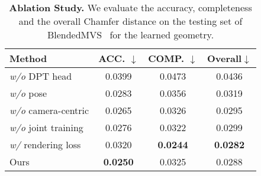 \begin{table}%
\centering
\caption{
\textbf{Ablation Study.} We evaluate the accuracy, completeness and the overall Chamfer distance on the testing set of BlendedMVS~\cite{yao2020blendedmvs} for the learned geometry. 
}
\small
\begin{tabular}{l|ccc}
\toprule
Method & ACC. $\downarrow$ & COMP. $\downarrow$ & Overall$\downarrow$ \\
\midrule
\textit{w/o} DPT head & 0.0399 & 0.0473 &  0.0436 \\
\textit{w/o} pose & 0.0283 & 0.0356 &  0.0319 \\
\textit{w/o} camera-centric  & 0.0265 & 0.0326 & 0.0295 \\
\textit{w/o} joint training  & 0.0276 & 0.0322 & 0.0299 \\
\textit{w/} rendering loss  & 0.0320 & \textbf{0.0244} & \textbf{0.0282}\\

\midrule
Ours  & \textbf{0.0250} & 0.0325 & 0.0288 \\
\bottomrule
\end{tabular}
\vspace{-1em}
\label{tab:ablation-study}
\end{table}
